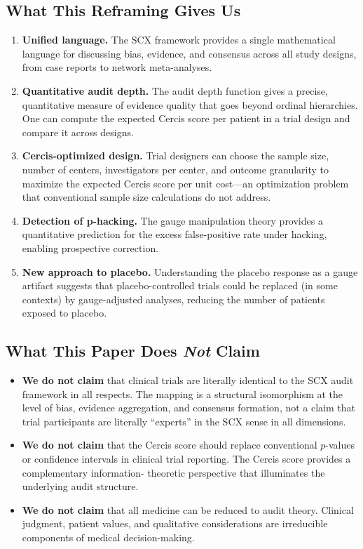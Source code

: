 \documentclass[12pt,a4paper]{article}
\theoremstyle{remark}
\newcommand{\SCX}{\textsf{SCX}}
\newcommand{\Cercis}{\textsf{Cercis}}
\begin{document}
\subsection{What This Reframing Gives Us}

\begin{enumerate}[leftmargin=*, label=(\arabic*)]
  \item \textbf{Unified language.} The \SCX{} framework provides a single
  mathematical language for discussing bias, evidence, and consensus across
  all study designs, from case reports to network meta-analyses.
  \item \textbf{Quantitative audit depth.} The audit depth function gives
  a precise, quantitative measure of evidence quality that goes beyond
  ordinal hierarchies. One can compute the expected \Cercis{} score per
  patient in a trial design and compare it across designs.
  \item \textbf{Cercis-optimized design.} Trial designers can choose the
  sample size, number of centers, investigators per center, and outcome
  granularity to maximize the expected \Cercis{} score per unit cost---an
  optimization problem that conventional sample size calculations do not
  address.
  \item \textbf{Detection of p-hacking.} The gauge manipulation theory
  provides a quantitative prediction for the excess false-positive rate
  under hacking, enabling prospective correction.
  \item \textbf{New approach to placebo.} Understanding the placebo response
  as a gauge artifact suggests that placebo-controlled trials could be
  replaced (in some contexts) by gauge-adjusted analyses, reducing the
  number of patients exposed to placebo.
\end{enumerate}

\subsection{What This Paper Does \emph{Not} Claim}

\begin{itemize}[leftmargin=*]
  \item \textbf{We do not claim} that clinical trials are literally
  identical to the \SCX{} audit framework in all respects. The mapping is a
  structural isomorphism at the level of bias, evidence aggregation, and
  consensus formation, not a claim that trial participants are literally
  ``experts'' in the \SCX{} sense in all dimensions.
  \item \textbf{We do not claim} that the \Cercis{} score should replace
  conventional $p$-values or confidence intervals in clinical trial
  reporting. The \Cercis{} score provides a complementary information-
  theoretic perspective that illuminates the underlying audit structure.
  \item \textbf{We do not claim} that all medicine can be reduced to audit
  theory. Clinical judgment, patient values, and qualitative considerations
  are irreducible components of medical decision-making.
\end{itemize}
\end{document}
